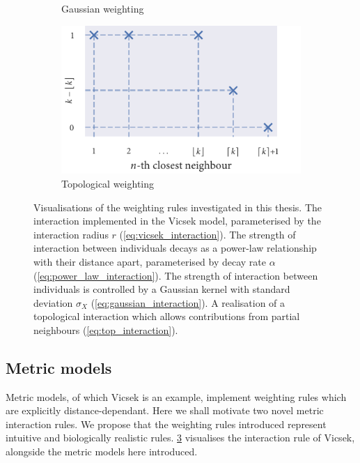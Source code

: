\begin{figure}[tb]
\begin{subfigure}[b]{0.5\textwidth}
        \caption{Gaussian weighting}
        \label{fig:gauss_weight}
    \end{subfigure}%
    \begin{subfigure}[b]{0.5\textwidth}
        \includegraphics{topological_weighting.pdf}
        \caption{Topological weighting}
        \label{fig:top_weight}
    \end{subfigure}
    \caption{Visualisations of the weighting rules investigated in this thesis.
         The interaction implemented in the Vicsek model,
        parameterised by the interaction radius $r$ (\cref{eq:vicsek_interaction}).
         The strength of interaction between individuals decays
        as a power-law relationship with their distance apart, parameterised by decay
        rate $\alpha$ (\cref{eq:power_law_interaction}).  The
        strength of interaction between individuals is controlled by a Gaussian kernel
        with standard deviation $\sigma_X$ (\cref{eq:gaussian_interaction}).
         A realisation of a topological interaction which allows
        contributions from partial neighbours (\cref{eq:top_interaction}).
    }
    \label{fig:weighting_rules}
\end{figure}

\subsection{Metric models}

Metric models, of which Vicsek is an example, implement weighting rules which are
explicitly distance-dependant. Here we shall motivate two novel metric interaction rules.
We propose that the weighting rules introduced represent intuitive and biologically
realistic rules. \cref{fig:weighting_rules} visualises the interaction rule of Vicsek,
alongside the metric models here introduced.

